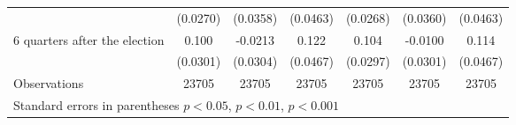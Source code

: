 \begin{table}[!ht]
\begin{tabular}{l*{6}{c}}
                    &    (0.0270)         &    (0.0358)         &    (0.0463)         &    (0.0268)         &    (0.0360)         &    (0.0463)         \\
[0.5em]
 6 quarters after the election&       0.100\sym{***}&     -0.0213         &       0.122\sym{**} &       0.104\sym{***}&     -0.0100         &       0.114\sym{*}  \\
                    &    (0.0301)         &    (0.0304)         &    (0.0467)         &    (0.0297)         &    (0.0301)         &    (0.0467)         \\
\hline
Observations        &       23705         &       23705         &       23705         &       23705         &       23705         &       23705         \\
\hline\hline
\multicolumn{7}{l}{ Standard errors in parentheses \sym{*} \(p<0.05\), \sym{**} \(p<0.01\), \sym{***} \(p<0.001\)}\\
\end{tabular}
\end{table}
